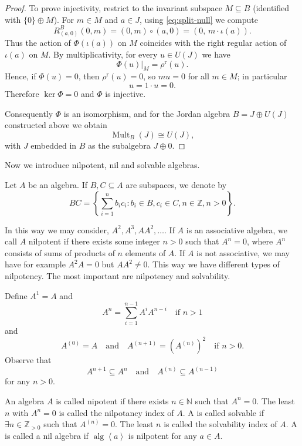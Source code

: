 \documentclass{article}
\def\<{\mathop{\langle}}
\def\>{\mathop{\rangle}}
\begin{document}
\begin{proof}
To prove injectivity, restrict to the invariant subspace $M\subseteq B$ (identified with $\{0\}\oplus M$).
For $m\in M$ and $a\in J$, using \eqref{eq:split-null} we compute
\[
R^B_{(a,0)}(0,m)=(0,m)\circ (a,0)=(0,\,m\cdot \iota(a)).
\]
Thus the action of $\Phi(\iota(a))$ on $M$ coincides with the right regular action of $\iota(a)$ on $M$.
By multiplicativity, for every $u\in U(J)$ we have
\[
\Phi(u)\big|_{M}=\rho^{\mathrm r}(u).
\]
Hence, if $\Phi(u)=0$, then $\rho^{\mathrm r}(u)=0$, so $m u=0$ for all $m\in M$; in particular
\[
u=1\cdot u=0.
\]
Therefore $\ker\Phi=0$ and $\Phi$ is injective.

Consequently $\Phi$ is an isomorphism, and for the Jordan algebra $B=J\oplus U(J)$ constructed above we obtain
\[
\operatorname{Mult}_B(J)\cong U(J),
\]
with $J$ embedded in $B$ as the subalgebra $J\oplus 0$.
\end{proof}

Now we introduce nilpotent, nil and solvable algebras.

Let $A$ be an algebra. If $B, C \subseteq A$ are subspaces, we denote by  
\[ BC = \left\{ \sum_{i=1}^n b_i c_i : b_i \in B, c_i \in C, n \in \mathbb{Z}, n>0 \right\}. \]  

In this way we may consider, $A^2, A^3, A A^2, \dots$. If $A$ is an associative algebra, we call $A$ nilpotent if there exists some integer $n>0$ such that $A^n=0$, where $A^n$ consists of sums of products of $n$ elements of $A$. If $A$ is not associative, we may have for example $A^2 A=0$ but $A A^2 \neq 0$.  
This way we have different types of nilpotency. The most important are nilpotency and solvability.  

Define $A^1 = A$ and  
\[ A^n = \sum_{i=1}^{n-1} A^i A^{n-i} \quad \text{if } n > 1 \]  
and  
\[ A^{(0)} = A \quad \text{and} \quad A^{(n+1)} = (A^{(n)})^2 \quad \text{if } n > 0. \]  
Observe that  
\[ A^{n+1} \subseteq A^n \quad \text{and} \quad A^{(n)} \subseteq A^{(n-1)} \]  
for any $n > 0$.  

\begin{definition} 
An algebra $ A $ is called nipotent if there exists $ n \in \mathbb{N} $ such that $ A^n =0 $. The least $ n $ with $ A^n =0 $ is called the nilpotancy index of $ A $. A is called solvable if $ \exists n \in \mathbb{Z}_{>0} $ such that $ A^{(n )}=0 $. The least $ n $ is called the solvability index of $ A $. A is called a nil algebra if $ \operatorname{alg}\< a \> $ is nilpotent for any $ a\in A $.         
\end{definition}
\end{document}
